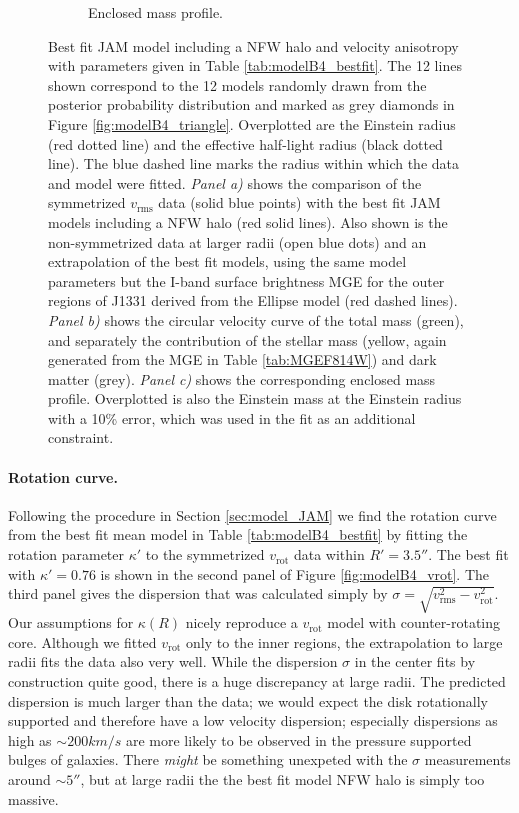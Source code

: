 \begin{figure}
\begin{subfigure}{.48\textwidth}
  \caption{Enclosed mass profile.}
  \label{fig:modelB4_enclMass}
\end{subfigure}
\caption{Best fit JAM model including a NFW halo and velocity anisotropy with parameters given in Table \ref{tab:modelB4_bestfit}. The 12 lines shown correspond to the 12 models randomly drawn from the posterior probability distribution and marked as grey diamonds in Figure \ref{fig:modelB4_triangle}. Overplotted are the Einstein radius (red dotted line) and the effective half-light radius (black dotted line). The blue dashed line marks the radius within which the data and model were fitted. \emph{Panel a)} shows the comparison of the symmetrized $v_\text{rms}$ data (solid blue points) with the best fit JAM models including a NFW halo (red solid lines). Also shown is the non-symmetrized data at larger radii (open blue dots) and an extrapolation of the best fit models, using the same model parameters but the I-band surface brightness MGE for the outer regions of J1331 derived from the Ellipse model (red dashed lines). \emph{Panel b)} shows the circular velocity curve of the total mass (green), and separately the contribution of the stellar mass (yellow, again generated from the MGE in Table \ref{tab:MGEF814W}) and dark matter (grey).  \emph{Panel c)} shows the corresponding enclosed mass profile. Overplotted is also the Einstein mass at the Einstein radius with a 10\% error, which was used in the fit as an additional constraint. }
\label{fig:modelB4_models}
\end{figure}



\paragraph{Rotation curve.} Following the procedure in Section \ref{sec:model_JAM} we find the rotation curve from the best fit mean model in Table \ref{tab:modelB4_bestfit} by fitting the rotation parameter $\kappa'$ to the symmetrized $v_\text{rot}$ data within $R' = 3.5''$. The best fit with $\kappa' = 0.76$ is shown in the second panel of Figure \ref{fig:modelB4_vrot}. The third panel gives the dispersion that was calculated simply by $\sigma = \sqrt{v_\text{rms}^2 - v_\text{rot}^2}$. Our assumptions for $\kappa(R)$ nicely reproduce a $v_\text{rot}$ model with counter-rotating core. Although we fitted $v_\text{rot}$ only to the inner regions, the extrapolation to large radii fits the data also very well. While the dispersion $\sigma$ in the center fits by construction quite good, there is a huge discrepancy at large radii. The predicted dispersion is much larger than the data; we would expect the disk rotationally supported and therefore have a low velocity dispersion; especially dispersions as high as $\sim 200 km/s$ are more likely to be observed in the pressure supported bulges of galaxies. There \emph{might} be something unexpeted with the $\sigma$ measurements around $\sim 5''$, but at large radii the the best fit model NFW halo is simply too massive. 

